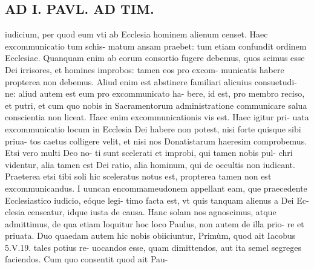 \documentclass{article}
\begin{document}
\begin{pages}
\section*{AD I. PAVL. AD TIM. }
\marginpar{[ p.432 ]}\pstart iudicium, per quod eum vti ab Ecclesia hominem alienum censet. Haec excommunicatio tum schis- matum ansam praebet: tum etiam confundit ordinem Ecclesiae. Quanquam enim ab eorum consortio fugere debemus, quos scimus esse Dei irrisores, et homines improbos: tamen eos pro excom- municatis habere propterea non debemus. Aliud enim est abstinere familiari alicuius consuetudi- ne: aliud autem est eum pro excommunicato ha- bere, id est, pro membro reciso, et putri, et cum quo nobis in Sacramentorum administratione communicare salua conscientia non liceat. Haec enim excommunicationis vis est. Haec igitur pri- uata excommunicatio locum in Ecclesia Dei habere non potest, nisi forte quisque sibi priua- tos caetus colligere velit, et nisi nos Donatistarum haeresim comprobemus. Etsi vero multi Deo no- ti sunt scelerati et improbi, qui tamen nobis pul- chri videntur, alia tamen est Dei ratio, alia hominum, qui de occultis non iudicant. Praeterea etsi tibi soli hic sceleratus notus est, propterea tamen non est excommunicandus.  \pend\pstart I uuncan encommameudonem appellant eam, que praecedente Ecclesiastico iudicio, eóque legi- timo facta est, vt quis tanquam alienus a Dei Ec- clesia censeatur, idque iusta de causa. Hanc solam nos agnoscimus, atque admittimus, de qua etiam loquitur hoc loco Paulus, non autem de illa prio- re et priuata.  \pend\pstart Duo quaedam autem hic nobis obiiciuntur, Primùm, quod ait Iacobus 5.V.19. tales potius re- uocandos esse, quam dimittendos, aut ita semel segreges faciendos. Cum quo consentit quod ait Pau-  \pend

\end{pages}
\end{document}
